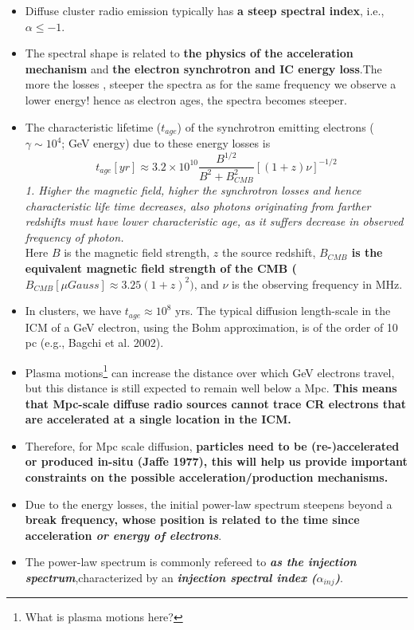 \documentclass[11pt]{report}
\newcommand{\tbf}[1]{\textbf{#1}}
\newcommand{\tit}[1]{\textit{#1}}
\newcommand{\fn}[1]{\footnote{#1}}
\newcommand{\rr}[1]{\left[{#1}\right]}
\begin{document}
 \begin{itemize}
 \item Diffuse cluster radio emission typically has \tbf{a steep spectral index}, i.e., $\alpha \leq -1$. 
 \item The spectral shape is related to \tbf{the physics of the acceleration mechanism} and \tbf{the electron synchrotron and IC energy loss}.The more the losses , steeper the spectra as  for the same frequency  we observe a lower energy! hence as electron ages, the spectra becomes steeper.
 \item  The characteristic lifetime ($t_{age}$) of the synchrotron emitting electrons ($\gamma \sim 10^4$; GeV energy) due to these energy losses is
 \begin{equation}
 t_{age}[yr]\approx 3.2 \times 10^{10} \frac{B^{1/2}}{B^2+B^2_{CMB}}\rr{(1+z)\nu}^{-1/2}
 \end{equation}
 \tit{1. Higher the magnetic field, higher the synchrotron losses and hence characteristic life time decreases, also photons originating from farther redshifts must have lower characteristic age, as it suffers decrease in observed frequency of photon.}\\
Here $B$ is  the magnetic field strength, $z$ the source redshift,\tbf{ $B_{CMB}$ is the equivalent magnetic field strength of the CMB ($B_{CMB} [\mu Gauss] \approx 3.25(1+z)^2)$}, and $\nu$ is the observing frequency in MHz.
\item In clusters, we have $t_{age} \approx10^8$ yrs. The typical diffusion length-scale in the ICM of a GeV electron, using the Bohm approximation, is of the order of 10 pc (e.g., Bagchi et al. 2002). 

\item Plasma motions\fn{What is plasma motions here?} can increase the distance over which GeV electrons travel, but this distance is still expected to remain well below a Mpc. \textbf{This means that Mpc-scale diffuse radio sources cannot trace CR electrons that are accelerated at a single location in the ICM.}

\item  Therefore, for Mpc scale diffusion, \textbf{particles need to be (re-)accelerated or produced in-situ (Jaffe 1977), this will help us provide important constraints on the possible acceleration/production mechanisms.}
\item  Due to the energy losses, the initial power-law spectrum steepens beyond a \textbf{break frequency, whose position is related to the time since acceleration\tit{ or energy of electrons}}.
\item The power-law spectrum is commonly refereed to \tit{\tbf{as the injection spectrum}},characterized by an \tbf{\tit{injection spectral index ($\alpha_{inj}$)}}.
 \end{itemize}
\end{document}
